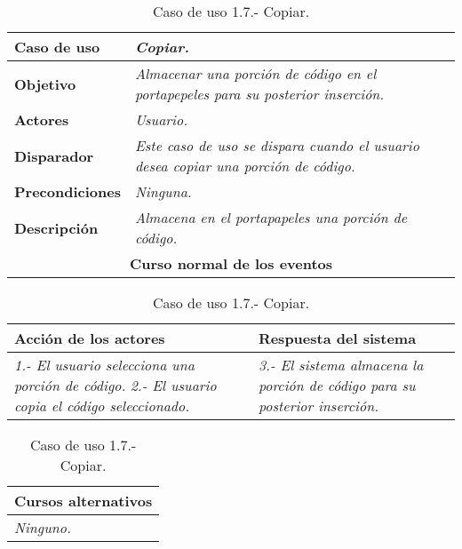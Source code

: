    \begin{table}[!ht] %
      \centering
      \begin{tabular}{|p{4cm}|p{11.5cm}|}
      \hline
      \textbf{Caso de uso} & \textit{Copiar.}\\ \hline
      \textbf{Objetivo} & \textit{Almacenar una porción de código en el portapepeles para su posterior inserción.}\\ \hline
      \textbf{Actores} & \textit{Usuario.}\\ \hline 
      \textbf{Disparador} & \textit{Este caso de uso se dispara cuando el usuario desea copiar una porción de código.}\\ \hline
      \textbf{Precondiciones} & \textit{Ninguna.}\\ \hline  
      \textbf{Descripción} & \textit{Almacena en el portapapeles una porción de código.}\\ \hline
      \multicolumn{2}{|c|}{\textbf{Curso normal de los eventos}}\\ \hline
    \end{tabular}
    \begin{tabular}{|p{7.75cm}|p{7.75cm}|}
      \hspace{2cm}\textbf{Acción de los actores} & \hspace{1.75cm}\textbf{Respuesta del sistema}\\ \hline
      \textit{1.- El usuario selecciona una porción de código.} \textit{2.- El usuario copia el código seleccionado.} &
                                                \textit{3.- El sistema almacena la porción de código para su posterior inserción.} \\ \hline
    \end{tabular}
    \begin{tabular}{|p{15.9cm}|}
      \hspace{6cm}\textbf{Cursos alternativos}\\ \hline     
      \textit{Ninguno.} \\ \hline
    \end{tabular}
    \caption{Caso de uso 1.7.- Copiar.}
   \end{table}


